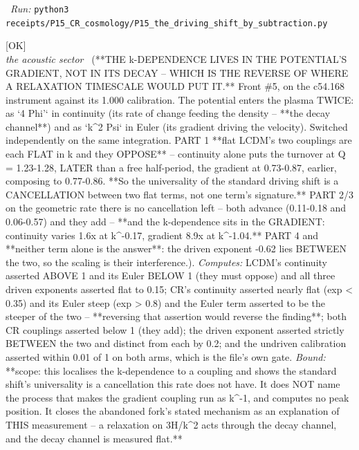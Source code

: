 \begin{description}
\ \emph{Run:} \texttt{python3 receipts/P15\_CR\_cosmology/P15\_the\_driving\_shift\_by\_subtraction.py}
\item[\rcptlabel{P15_which_coupling_carries_the_k_dependence}{P15R65}\textbf{P15R65}\quad\texttt{P15\_which\_coupling\_carries\_the\_k\_dependence}]\hfill\textsf{[OK]}\\
\textit{the acoustic sector} \ (**THE k-DEPENDENCE LIVES IN THE POTENTIAL'S GRADIENT, NOT IN ITS DECAY -- WHICH IS THE REVERSE OF WHERE A RELAXATION TIMESCALE WOULD PUT IT.** Front \#5, on the c54.168 instrument against its 1.000 calibration. The potential enters the plasma TWICE: as `4 Phi'` in continuity (its rate of change feeding the density -- **the decay channel**) and as `k\textasciicircum{}2 Psi` in Euler (its gradient driving the velocity). Switched independently on the same integration. PART 1 **flat LCDM's two couplings are each FLAT in k and they OPPOSE** -- continuity alone puts the turnover at Q = 1.23-1.28, LATER than a free half-period, the gradient at 0.73-0.87, earlier, composing to 0.77-0.86. **So the universality of the standard driving shift is a CANCELLATION between two flat terms, not one term's signature.** PART 2/3 on the geometric rate there is no cancellation left -- both advance (0.11-0.18 and 0.06-0.57) and they add -- **and the k-dependence sits in the GRADIENT: continuity varies 1.6x at k\textasciicircum{}-0.17, gradient 8.9x at k\textasciicircum{}-1.04.** PART 4 and **neither term alone is the answer**: the driven exponent -0.62 lies BETWEEN the two, so the scaling is their interference.). 
\emph{Computes:} LCDM's continuity asserted ABOVE 1 and its Euler BELOW 1 (they must oppose) and all three driven exponents asserted flat to 0.15; CR's continuity asserted nearly flat (\textbar{}exp\textbar{} < 0.35) and its Euler steep (\textbar{}exp\textbar{} > 0.8) and the Euler term asserted to be the steeper of the two -- **reversing that assertion would reverse the finding**; both CR couplings asserted below 1 (they add); the driven exponent asserted strictly BETWEEN the two and distinct from each by 0.2; and the undriven calibration asserted within 0.01 of 1 on both arms, which is the file's own gate.
 \emph{Bound:} **scope: this localises the k-dependence to a coupling and shows the standard shift's universality is a cancellation this rate does not have. It does NOT name the process that makes the gradient coupling run as k\textasciicircum{}-1, and computes no peak position. It closes the abandoned fork's stated mechanism as an explanation of THIS measurement -- a relaxation on 3H/k\textasciicircum{}2 acts through the decay channel, and the decay channel is measured flat.**

\end{description}
